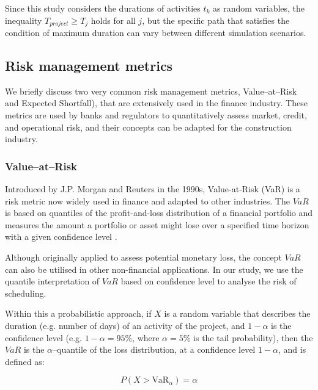 Since this study considers the durations of activities $t_k$ as random variables, the inequality $T_{project} \ge T_j$ holds for all $j$, but the specific path that satisfies the condition of maximum duration can vary between different simulation scenarios.

\label{sub:var}
\subsection{Risk management metrics}
We briefly discuss two very common risk management metrics, Value--at--Risk and Expected Shortfall), that are extensively used in the finance industry. These metrics are used by banks and regulators to quantitatively assess market, credit, and operational risk, and their concepts can be adapted for the construction industry. 


\subsubsection{Value--at--Risk}

Introduced by J.P. Morgan and Reuters in the 1990s, Value-at-Risk (VaR) is a risk metric now widely used in finance and adapted to other industries. The $VaR$ is based on quantiles of the profit-and-loss distribution of a financial portfolio and measures the amount a portfolio or asset might lose over a specified time horizon with a given confidence level \citep{Riskmetrics}.

Although originally applied to assess potential monetary loss, the concept $VaR$ can also be utilised in other non-financial applications. In our study, we use the quantile interpretation of $VaR$ based on confidence level to analyse the risk of scheduling.   

 
Within this a probabilistic approach, if $X$ is a random variable that describes the duration (e.g. number of days) of an activity of the project, and $1-\alpha$ is the confidence level (e.g. $1-\alpha=95\%$, where $\alpha=5\%$ is the tail probability), then the $VaR$ is the $\alpha$--quantile of the loss distribution, at a confidence level $1-\alpha$, and is defined as:
 
\begin{equation}
    P(X > \text{VaR}_{\alpha})= \alpha
\end{equation}

